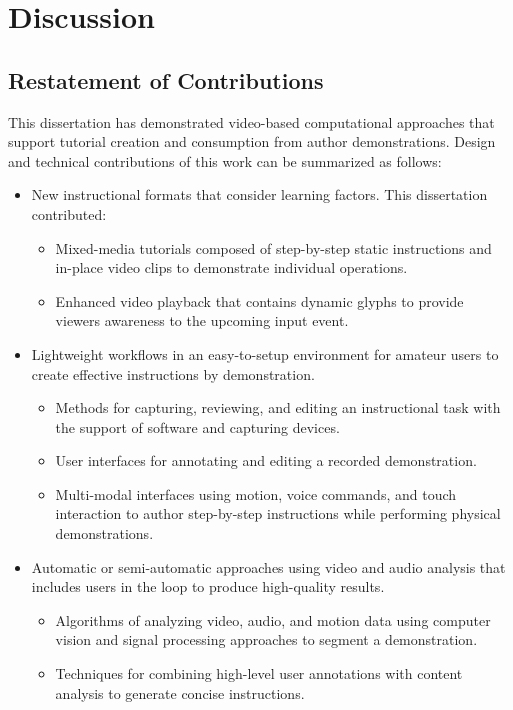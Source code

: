 \chapter{Discussion}
\label{chapter_conclusion}

\section{Restatement of Contributions}
This dissertation has demonstrated video-based computational approaches that support tutorial creation and consumption from author demonstrations. Design and technical contributions of this work can be summarized as follows:

\begin{itemize}
  \item New instructional formats that consider learning factors. This dissertation contributed:
    \begin{itemize}
      \item Mixed-media tutorials composed of step-by-step static instructions and in-place video clips to demonstrate individual operations.
      \item Enhanced video playback that contains dynamic glyphs to provide viewers awareness to the upcoming input event.
    \end{itemize}
  \item Lightweight workflows in an easy-to-setup environment for amateur users to create effective instructions by demonstration.
    \begin{itemize}
      \item Methods for capturing, reviewing, and editing an instructional task with the support of software and capturing devices.
      \item User interfaces for annotating and editing a recorded demonstration.
      \item Multi-modal interfaces using motion, voice commands, and touch interaction to author step-by-step instructions while performing physical demonstrations.
    \end{itemize}
  \item Automatic or semi-automatic approaches using video and audio analysis that includes users in the loop to produce high-quality results.
    \begin{itemize}
      \item Algorithms of analyzing video, audio, and motion data using computer vision and signal processing approaches to segment a demonstration.
      \item Techniques for combining high-level user annotations with content analysis to generate concise instructions.
    \end{itemize}
\end{itemize}

